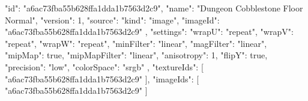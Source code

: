 {
  "id": "a6ac73fba55b628ffa1dda1b7563d2c9",
  "name": "Dungeon Cobblestone Floor Normal",
  "version": 1,
  "source": {
    "kind": "image",
    "imageId": "a6ac73fba55b628ffa1dda1b7563d2c9"
  },
  "settings": {
    "wrapU": "repeat",
    "wrapV": "repeat",
    "wrapW": "repeat",
    "minFilter": "linear",
    "magFilter": "linear",
    "mipMap": true,
    "mipMapFilter": "linear",
    "anisotropy": 1,
    "flipY": true,
    "precision": "low",
    "colorSpace": "srgb"
  },
  "textureIds": [
    "a6ac73fba55b628ffa1dda1b7563d2c9"
  ],
  "imageIds": [
    "a6ac73fba55b628ffa1dda1b7563d2c9"
  ]
}
